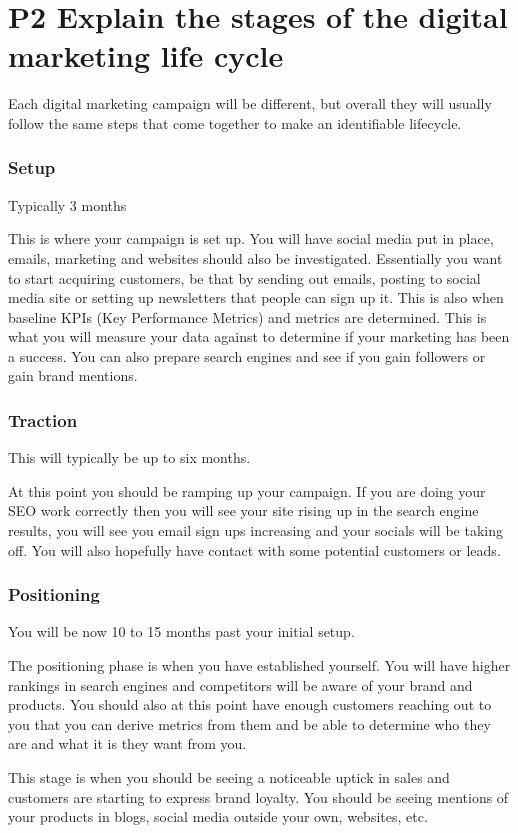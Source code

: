 \documentclass{article}
\begin{document}
\section{P2 Explain the stages of the digital marketing life cycle}

Each digital marketing campaign will be different, but overall they will usually follow the same steps that come together to make an identifiable lifecycle.

\subsubsection{Setup}
Typically 3 months

This is where your campaign is set up. 
You will have social media put in place, emails, marketing and websites should also be investigated.
Essentially you want to start acquiring customers, be that by sending out emails, posting to social media site or setting up newsletters that people can sign up it.
This is also when baseline KPIs (Key Performance Metrics) and metrics are determined. This is what you will measure your data against to determine if your marketing has been a success.
You can also prepare search engines and see if you gain followers or gain brand mentions.
\subsubsection{Traction}
This will typically be up to six months.

At this point you should be ramping up your campaign. If you are doing your SEO work correctly then you will see your site rising up in the search engine results, you will see you email sign ups increasing and your socials will be taking off.
You will also hopefully have contact with some potential customers or leads.

\subsubsection{Positioning}
You will be now 10 to 15 months past your initial setup.

The positioning phase is when you have established yourself. You will have higher rankings in search engines and competitors will be aware of your brand and products. 
You should also at this point have enough customers reaching out to you that you can derive metrics from them and be able to determine who they are and what it is they want from you. 

This stage is when you should be seeing a noticeable uptick in sales and customers are starting to express brand loyalty.
You should be seeing mentions of your products in blogs, social media outside your own, websites, etc.
\end{document}
